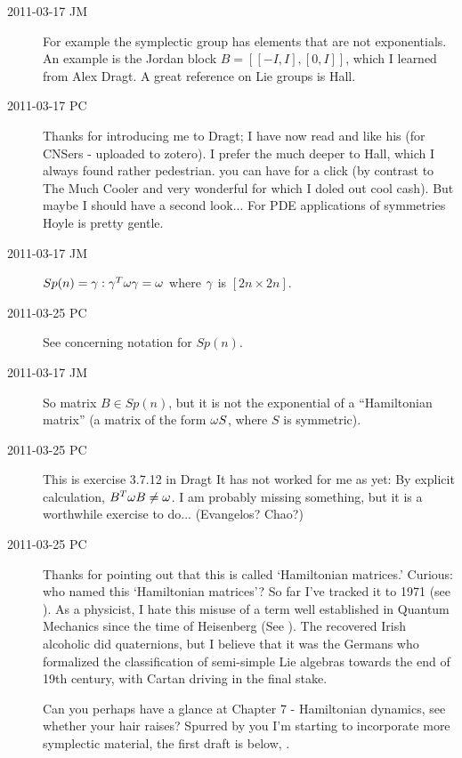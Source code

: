 \begin{description}
\item[2011-03-17 JM]
For example the symplectic group has elements that are not exponentials.
An example is the Jordan block $B=[[-I, I],[0,I]]$, which I learned from
Alex Dragt. A great reference on Lie groups is Hall.

\item[2011-03-17 PC]
Thanks for introducing me to Dragt; I have now read and like his
 (for CNSers - uploaded to zotero). I prefer the much
deeper  to Hall, which I always found rather
pedestrian.  you can have for
a click (by contrast to The Much Cooler and very wonderful
 for which I doled out cool cash). But maybe I should
have a second look... For PDE applications of symmetries
Hoyle is pretty gentle.


\item[2011-03-17 JM]
$Sp(n) = {\gamma :  \gamma^T {\bf \omega} \gamma = {\bf \omega}}$
where $\gamma$ is $[2n\!\times\!2n]$.

\item[2011-03-25 PC]
See  concerning notation for $Sp(n)$.

\item[2011-03-17 JM]
So matrix $B \in Sp(n)$, but it is not the exponential of a
``Hamiltonian matrix'' (a matrix of the form ${\bf \omega}S$, where $S$
is symmetric).

\item[2011-03-25 PC]
This is exercise 3.7.12 in Dragt
It has not worked for me as yet:
By explicit calculation, $B^T {\bf \omega} B \neq {\bf \omega}$.
I am probably missing something, but it is a worthwhile exercise
to do... (Evangelos? Chao?)

\item[2011-03-25 PC]
Thanks for pointing out that this is called `Hamiltonian matrices.'
Curious: who named this `Hamiltonian matrices'? So far I've tracked it to 1971
(see ).
As a physicist, I hate
this misuse of a term well established in Quantum Mechanics since the
time of Heisenberg (See ). The recovered Irish
alcoholic did quaternions, but I believe that it was the Germans who
formalized the classification of semi-simple Lie algebras towards the end
of 19th century, with Cartan driving in the final stake.

Can you perhaps have a glance at
 {Chapter 7 -
Hamiltonian dynamics}, see whether your hair raises? Spurred by you I'm
starting to incorporate more symplectic material, the first draft is
below, .


\end{description}
